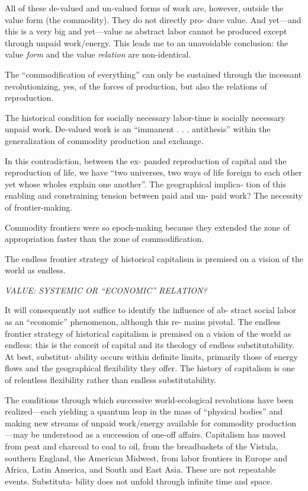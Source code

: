 \documentclass[
]{book}
\begin{document}
All of these de-valued and un-valued forms of work are, however,
outside the value form (the commodity). They do not directly pro-
duce value. And yet---and this is a very big and yet---value as abstract
labor cannot be produced except through unpaid work/energy. This
leads me to an unavoidable conclusion: the value \emph{form} and the value
\emph{relation} are non-identical.

The ``commodification of everything'' can
only be sustained through the incessant revolutionizing, yes, of the
forces of production, but also the relations of reproduction.

The historical condition for socially necessary labor-time is
socially necessary unpaid work. De-valued work is an ``immanent . . .
antithesis'' within the generalization of commodity production and
exchange.

In this contradiction, between the ex-
panded reproduction of capital and the reproduction of life, we have
``two universes, two ways of life foreign to each other yet whose wholes
explain one another''.
The geographical implica-
tion of this enabling and constraining tension between paid and un-
paid work? The necessity of frontier-making.

Commodity frontiers were so epoch-making
because they extended the zone of appropriation faster than the zone
of commodification.

The endless frontier strategy of historical capitalism is
premised on a vision of the world as endless.

\emph{VALUE: SYSTEMIC OR ``ECONOMIC'' RELATION?}

It will consequently not suffice to identify the influence of ab-
stract social labor as an ``economic'' phenomenon, although this re-
mains pivotal. The endless frontier strategy of historical capitalism is
premised on a vision of the world as endless: this is the conceit of
capital and its theology of endless substitutability.
At best, substitut-
ability occurs within definite limits, primarily those of energy flows
and the geographical flexibility they offer. The history of capitalism is
one of relentless flexibility rather than endless substitutability.

The
conditions through which successive world-ecological revolutions have
been realized---each yielding a quantum leap in the mass of ``physical
bodies'' and making new streams of unpaid work/energy available for
commodity production---may be understood as a succession of one-off
affairs. Capitalism has moved from peat and charcoal to coal to oil,
from the breadbaskets of the Vistula, southern England, the American
Midwest, from labor frontiers in Europe and Africa, Latin America,
and South and East Asia. These are not repeatable events. Substituta-
bility does not unfold through infinite time and space.
\end{document}
